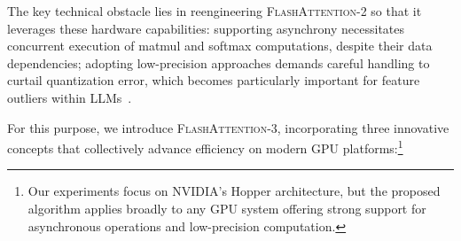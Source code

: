 The key technical obstacle lies in reengineering \textsc{FlashAttention-2} so that it leverages these hardware capabilities: supporting asynchrony necessitates concurrent execution of matmul and softmax computations, despite their data dependencies; adopting low-precision approaches demands careful handling to curtail quantization error, which becomes particularly important for feature outliers within LLMs~\citep{dettmers2208llm, sun2024massive}.

For this purpose, we introduce \textsc{FlashAttention-3}, incorporating three innovative concepts that collectively advance efficiency on modern GPU platforms:\footnote{Our experiments focus on NVIDIA's Hopper architecture, but the proposed algorithm applies broadly to any GPU system offering strong support for asynchronous operations and low-precision computation.}

